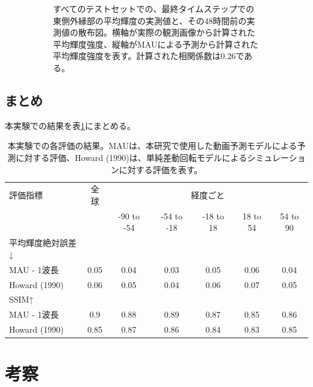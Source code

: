 \begin{figure}[htbp]
\begin{subfigure}[b]{0.55\textwidth}
            \caption{すべてのテストセットでの、最終タイムステップでの東側外縁部の平均輝度の実測値と、その48時間前の実測値の散布図。横軸が実際の観測画像から計算された平均輝度強度、縦軸がMAUによる予測から計算された平均輝度強度を表す。計算された相関係数は0.26である。}
          \end{subfigure}
          \caption{}
          \label{fig:exp1_limb_scatter}
        \end{figure}
    
    \subsection{まとめ}
      
      本実験での結果を表\ref{tab:exp1_result}にまとめる。
      \begin{table}[htbp]
        \centering
        \caption{本実験での各評価の結果。MAUは、本研究で使用した動画予測モデルによる予測に対する評価、Howard (1990)は、単純差動回転モデルによるシミュレーションに対する評価を表す。}
        \begin{tabular}{lcccccc}
        \hline
        評価指標 & 全球 & \multicolumn{5}{c}{経度ごと} \\
        \cline{3-7}
         &  & -90 to -54 & -54 to -18 & -18 to 18 & 18 to 54 & 54 to 90 \\
        \hline\hline
        平均輝度絶対誤差↓ & & & & & & \\
        \quad MAU - 1波長 & 0.05 & 0.04 & 0.03 & 0.05 & 0.06 & 0.04 \\
        \quad Howard (1990) & 0.06 & 0.05 & 0.04 & 0.06 & 0.07 & 0.05 \\
        \hline
        SSIM↑ & & & & & & \\
        \quad MAU - 1波長  & 0.9 & 0.88 & 0.89 & 0.87 & 0.85 & 0.86 \\
        \quad Howard (1990) & 0.85 & 0.87 & 0.86 & 0.84 & 0.83 & 0.85 \\
        \hline
        \end{tabular}
        \label{tab:exp1_result}
      \end{table}
       

  \section{考察}

